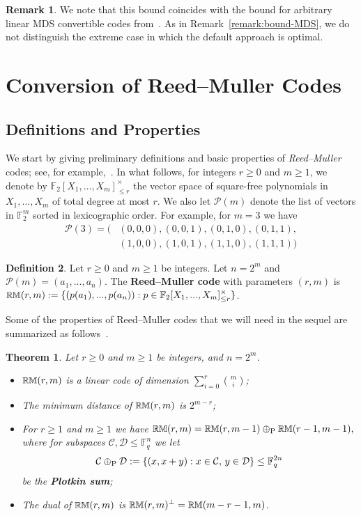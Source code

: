 \documentclass[conference, 10pt]{IEEEtran}
\theoremstyle{plain}
\newtheorem{theorem}{Theorem}
\theoremstyle{definition}
\newtheorem{definition}{Definition}
\newtheorem{remark}[definition]{Remark}
\newcommand{\RM}{{\text{\small $\mathbb{RM}$}}}
\newcommand{\numberset}{\mathbb}
\newcommand{\F}{\numberset{F}}
\newcommand{\mC}{\mathcal{C}}
\newcommand{\mP}{\mathcal{P}}
\newcommand{\mD}{\mathcal{D}}
\newcommand{\ps}{\oplus_\textnormal{P}}
\begin{document}
\begin{remark}
We note that this bound coincides with the bound for arbitrary linear MDS convertible codes from~\cite{maturana2022convertible}. As in Remark~\ref{remark:bound-MDS}, we do not distinguish the extreme case in which the default approach is optimal. 
\end{remark}


\section{Conversion of Reed--Muller Codes}\label{sec:RM}

\subsection{Definitions and Properties}
We start by giving preliminary definitions and basic properties of \emph{Reed--Muller} codes; see, for example,~\cite{macwilliams1977theory, abbe2020reed}. In what follows, for integers $r \ge 0$ and $m \ge 1$, we denote by $\F_2[X_1,\dots,X_m]_{\le r}^\times$
the vector space of square-free polynomials in $X_1,\dots,X_m$ of total degree at most $r$. 
We also let $\mathcal{P}(m)$ denote the list of vectors in $\F_2^m$ sorted in lexicographic order. For example,
for $m=3$ we have
\begin{align} \label{ptsRM}
\mathcal{P}(3)=
\bigl(&(0,0,0),(0,0,1),(0,1,0),(0,1,1),
\\ &(1,0,0),(1,0,1),(1,1,0),(1,1,1)\bigr) \nonumber
\end{align}
\begin{definition}\label{def:rm}
Let $r \ge 0$ and $m \ge 1$ be integers. Let $n=2^m$ and $\mP(m)=(a_1,...,a_n)$.
The \textbf{Reed--Muller code} with parameters $(r,m)$ is
$\RM(r,m):=\{(p(a_1),...,p(a_n)) : p \in \F_2[X_1,...,X_m]_{\le r}^\times\}$.
\end{definition}

Some of the properties of Reed--Muller codes that we will need in the sequel are summarized as follows~\cite{abbe2020reed}.

\begin{theorem} \label{thm:RMdim}
Let $r \ge 0$ and $m \ge 1$ be integers, and $n=2^m$. 
\begin{itemize}
    \item[(i)] $\RM(r,m)$ is a linear code of dimension $\sum_{i=0}^r \binom{m}{i}$;
    \item[(ii)] The minimum distance of $\RM(r,m)$ is
$2^{m-r}$;
    \item[(iii)] For $r\ge 1$ and $m \ge 1$ we have $\RM(r,m) = \RM(r,m-1) \ps \RM(r-1,m-1),$ where for subspaces $\mC, \mD \le \F_q^n$ we let $$\mC \ps \mD:=\{(x,x+y) : x \in \mC, \, y \in \mD \} \le \F_q^{2n}$$ be the \textbf{Plotkin sum};
    \item[(iv)] The dual of $\RM(r,m)$ is $\RM(r,m)^\perp = \RM(m-r-1,m)$.
\end{itemize}
\end{theorem}
\end{document}
